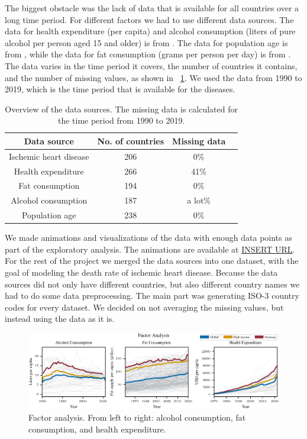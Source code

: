 The biggest obstacle was the lack of data that is available for all countries over a long time period. For different factors we had to use different data sources.
The data for health expenditure (per capita) and alcohol consumption (liters of pure alcohol per person aged 15 and older) is from \citet{oecd}. 
The data for population age is from \citet{age}, while the data for fat consumption (grams per person per day) is from \citet{fat_consumption}. The data varies in the time period it covers,
the number of countries it contains, and the number of missing values, as shown in \tablename~\ref{Data overview}. We used the data from 1990 to 2019, which is the time period
that is available for the diseases.

\begin{table}[h]
    \centering
    \caption{Overview of the data sources. The missing data is calculated for the time period from 1990 to 2019.}
    \label{Data overview}
    \begin{tabular}{|c|c|c|c|}
    \hline
    Data source & No. of countries & Missing data\\
    \hline
    Ischemic heart disease & 206 & 0\%\\
    Health expenditure & 266 & 41\%\\
    Fat consumption & 194 & 0\%\\
    Alcohol consumption & 187 & a lot\%\\
    Population age & 238 & 0\%\\
    \hline
    \end{tabular}
\end{table}

We made animations and visualizations of the data with enough data points as part of the exploratory analysis. The animations are available at \url{INSERT URL}. 
For the rest of the project we merged the data sources into one dataset, with the goal of modeling the death rate of ischemic heart disease. Because the data sources did not 
only have different countries, but also different country names we had to do some data preprocessing. The main part was generating ISO-3 country codes for every dataset. 
We decided on not averaging the missing values, but instead using the data as it is.



\begin{figure}[ht]
    \vskip 0.2in
    \centering
    \centerline{\includegraphics[]{fig/fig_factor_analysis.pdf}}
    \caption{Factor analysis. From left to right: alcohol consumption, fat consumption, and health expenditure. }
    \label{Factor analysis}
\end{figure}

